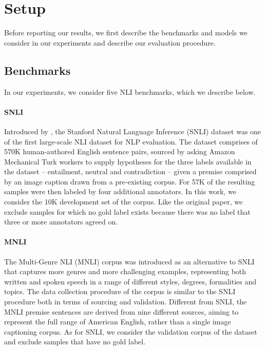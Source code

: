 \section{Setup}

Before reporting our results, we first describe the benchmarks and models we consider in our experiments and describe our evaluation procedure.

\subsection{Benchmarks}
In our experiments, we consider five NLI benchmarks, which we describe below.

\paragraph{SNLI}
Introduced by \citet{bowman-etal-2015-large}, the Stanford Natural Language Inference (SNLI) dataset was one of the first large-scale NLI dataset for NLP evaluation.
The dataset comprises of 570K human-authored English sentence pairs, sourced by asking Amazon Mechanical Turk workers to supply hypotheses for the three labels available in the dataset -- entailment, neutral and contradiction -- given a premise comprised by an image caption drawn from a pre-existing corpus.
For 57K of the resulting samples were then labeled by four additional annotators.
In this work, we consider the 10K development set of the corpus.
Like the original paper, we exclude samples for which no gold label exists because there was no label that three or more annotators agreed on.

\paragraph{MNLI}
The Multi-Genre NLI (MNLI) corpus \citep{williams-etal-2018-broad} was introduced as an alternative to SNLI that captures more genres and more challenging examples, representing both written and spoken speech in a range of different styles, degrees, formalities and topics.
The data collection procedure of the corpus is similar to the SNLI procedure both in terms of sourcing and validation.
Different from SNLI, the MNLI premise sentences are derived from nine different sources, aiming to represent the full range of American English, rather than a single image captioning corpus.
As for SNLI, we consider the validation corpus of the dataset and exclude samples that have no gold label.

